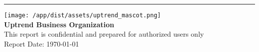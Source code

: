\documentclass[11pt,a4paper]{article}
\begin{document}
\vfill
\begin{center}
\hrule
\vspace{0.3cm}
\texttt{[image: /app/dist/assets/uptrend\_mascot.png]}\\[0.2cm]
\textcolor{uptrendblue}{\textbf{Uptrend Business Organization}}\\
\textcolor{uptrendgray}{\small This report is confidential and prepared for authorized users only}\\
\textcolor{uptrendgray}{\small Report Date: \today}
\end{center}
\end{document}
